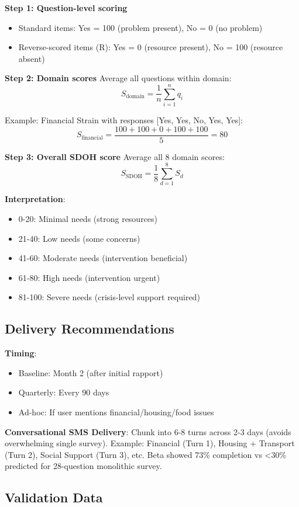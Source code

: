 \documentclass{article}
\begin{document}
\textbf{Step 1: Question-level scoring}
\begin{itemize}
    \item Standard items: Yes = 100 (problem present), No = 0 (no problem)
    \item Reverse-scored items (R): Yes = 0 (resource present), No = 100 (resource absent)
\end{itemize}

\textbf{Step 2: Domain scores}  
Average all questions within domain:
$$S_{\text{domain}} = \frac{1}{n} \sum_{i=1}^{n} q_i$$

Example: Financial Strain with responses [Yes, Yes, No, Yes, Yes]:
$$S_{\text{financial}} = \frac{100 + 100 + 0 + 100 + 100}{5} = 80$$

\textbf{Step 3: Overall SDOH score}  
Average all 8 domain scores:
$$S_{\text{SDOH}} = \frac{1}{8} \sum_{d=1}^{8} S_{d}$$

\textbf{Interpretation}:
\begin{itemize}
    \item 0-20: Minimal needs (strong resources)
    \item 21-40: Low needs (some concerns)
    \item 41-60: Moderate needs (intervention beneficial)
    \item 61-80: High needs (intervention urgent)
    \item 81-100: Severe needs (crisis-level support required)
\end{itemize}

\subsection*{Delivery Recommendations}

\textbf{Timing}:
\begin{itemize}
    \item Baseline: Month 2 (after initial rapport)
    \item Quarterly: Every 90 days
    \item Ad-hoc: If user mentions financial/housing/food issues
\end{itemize}

\textbf{Conversational SMS Delivery}: Chunk into 6-8 turns across 2-3 days (avoids overwhelming single survey). Example: Financial (Turn 1), Housing + Transport (Turn 2), Social Support (Turn 3), etc. Beta showed 73\% completion vs <30\% predicted for 28-question monolithic survey.

\subsection*{Validation Data}
\end{document}

